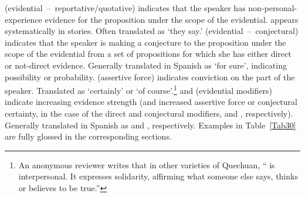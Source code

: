 (evidential~--~reportative/quotative) indicates that the speaker has non-perso\-nal-experience evidence for the proposition under the scope of the evidential.  appears systematically in stories. Often translated as ‘they say.’  (evidential~--~conjectural) indicates that the speaker is making a conjecture to the proposition under the scope of the evidential from a set of propositions for which she has either direct or not-direct evidence. Generally translated in Spanish as  ‘for sure’, indicating possibility or probability.  (assertive force) indicates conviction on the part of the speaker. Translated as ‘certainly’ or ‘of course’.\footnote{An anonymous reviewer writes that in other varieties of Quechuan, “ is interpersonal. It expresses solidarity, affirming what someone else says, thinks or believes to be true.”}  and  (evidential modifiers) indicate increasing evidence strength (and increased assertive force or conjectural certainty, in the case of the direct and conjectural modifiers,  and , respectively). Generally translated in Spanish as  and , respectively. Examples in Table~\ref{Tab30} are fully glossed in the corresponding sections.

